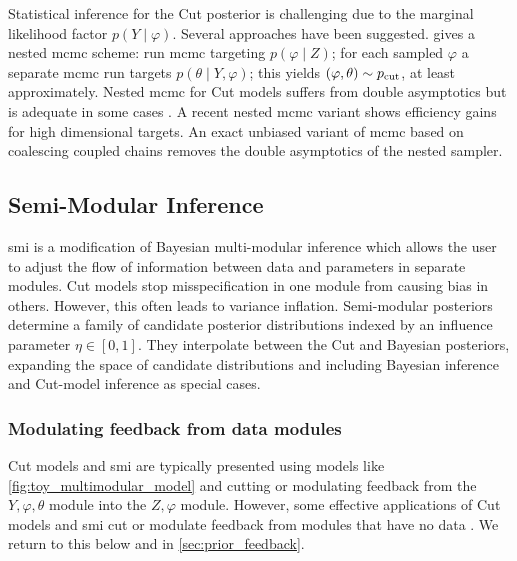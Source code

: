 Statistical inference for the Cut posterior is challenging due to the marginal likelihood factor $p(Y\mid \varphi)$.
Several approaches have been suggested.
\cite{Plummer2015cut} gives a nested \acrshort*{mcmc} scheme: run \acrshort*{mcmc} targeting $p(\varphi\mid Z)$; for each sampled $\varphi$ a separate \acrshort*{mcmc} run targets $p(\theta\mid Y,\varphi)$; this yields $(\varphi,\theta)\sim p_{\operatorname{\text{cut}}}$, at least approximately.
Nested \acrshort*{mcmc} for Cut models suffers from double asymptotics but is adequate in some cases \citep{Styring2017extensification,Teh2021covid,Moss2022}.
A recent nested \acrshort*{mcmc} variant \citep{Liu2020sacut} shows efficiency gains for high dimensional targets.
An exact unbiased variant of \acrshort*{mcmc} based on coalescing coupled chains \citep{Jacob2020couplings} removes the double asymptotics of the nested sampler.



\subsection{Semi-Modular Inference}

\acrfull*{smi} \citep{Carmona2020smi} is a modification of Bayesian multi-modular inference which allows the user to adjust the flow of information between data and parameters in separate modules.
Cut models stop misspecification in one module from causing bias in others.
However, this often leads to variance inflation.
Semi-modular posteriors determine a family of candidate posterior distributions indexed by an influence parameter $\eta\in [0,1]$.
They interpolate between the Cut and Bayesian posteriors, expanding the space of candidate distributions and including Bayesian inference and Cut-model inference as special cases.

\subsubsection{Modulating feedback from data modules}

Cut models and \acrshort*{smi} are typically presented using models like \cref{fig:toy_multimodular_model} and cutting or modulating feedback from the $Y,\varphi,\theta$ module into the $Z,\varphi$ module. However, some effective applications of Cut models and \acrshort*{smi} cut or modulate feedback from modules that have no data \citep{Jacob2017together,Styring2017extensification,Carmona2020smi,Yu2021variationalcut,Styring2022urban}. We return to this below and in \cref{sec:prior_feedback}.

